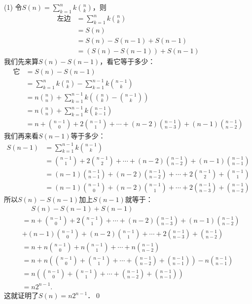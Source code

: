 (1) \prove 令$S(n) = \displaystyle\sum_{k=1}^{n} k \binom{n}{k}$，则
\begin{align}
    \text{左边} &= \sum_{k=1}^{n} k \binom{n}{k} \\
    &= S(n) \\
    &= S(n) - S(n-1) + S(n-1) \\
    &= (S(n) - S(n-1)) + S(n-1)
\end{align}
我们先来算$S(n)-S(n-1)$，看它等于多少：
\begin{align}
    \text{它} &= S(n) - S(n-1) \\
    &= \sum_{k = 1}^{n} k \binom{n}{k} - \sum_{k = 1}^{n-1} k \binom{n-1}{k} \\
    &= n \binom{n}{n} + \sum_{k=1}^{n-1} k \left(\binom{n}{k} - \binom{n-1}{k}\right) \\
    &= n \binom{n}{n} + \sum_{k=1}^{n-1} k \binom{n-1}{k-1} \\
    &= n + \binom{n-1}{0} + 2 \binom{n-1}{1} + \cdots + (n-2)\binom{n-1}{n-3} + (n-1)\binom{n-1}{n-2}
\end{align}
我们再来看$S(n-1)$等于多少：
\begin{align}
    S(n-1) &= \sum_{k=1}^{n-1} k \binom{n-1}{k} \\
    &= \binom{n-1}{1} + 2\binom{n-1}{2} + \cdots + (n-2)\binom{n-1}{n-2} + (n-1)\binom{n-1}{n-1} \\
    &= (n-1) \binom{n-1}{n-1} + (n-2)\binom{n-1}{n-2} + \cdots + 2 \binom{n-1}{2} + \binom{n-1}{1} \\
    &= (n-1) \binom{n-1}{0} + (n-2)\binom{n-1}{1} + \cdots + 2 \binom{n-1}{n-3} + \binom{n-1}{n-2}
\end{align}
所以$S(n)-S(n-1)$加上$S(n-1)$就等于：
\begin{align}
    &\mathrel{\phantom{=}} S(n) - S(n-1) + S(n-1) \\
    &= n + \binom{n-1}{0} + 2 \binom{n-1}{1} + \cdots + (n-2)\binom{n-1}{n-3} + (n-1)\binom{n-1}{n-2} \\
    &+ (n-1) \binom{n-1}{0} + (n-2)\binom{n-1}{1} + \cdots + 2 \binom{n-1}{n-3} + \binom{n-1}{n-2} \\
    &= n + n \binom{n-1}{0} + n \binom{n-1}{1} + \cdots + n\binom{n-1}{n-2} \\
    &= n + n (\binom{n-1}{0} +  \binom{n-1}{1} + \cdots + \binom{n-1}{n-2} + \binom{n-1}{n-1}) - n\binom{n-1}{n-1} \\
    &= n (\binom{n-1}{0} +  \binom{n-1}{1} + \cdots + \binom{n-1}{n-2} + \binom{n-1}{n-1}) \\
    &= n 2^{n-1}.
\end{align}
这就证明了$S(n) = n 2^{n-1}$．\qed\bigskip